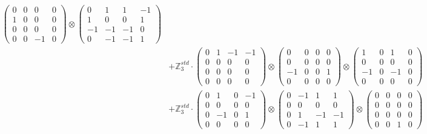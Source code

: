 \documentclass{article}
\begin{document}
{\begin{align}
            \begin{pmatrix} 0 & 0 & 0 & 0 \\ 1 & 0 & 0 & 0 \\ 0 & 0 & 0 & 0 \\ 0 & 0 & -1 & 0 \end{pmatrix} \otimes 
            \begin{pmatrix} 0 & 1 & 1 & -1 \\ 1 & 0 & 0 & 1 \\ -1 & -1 & -1 & 0 \\ 0 & -1 & -1 & 1 \end{pmatrix} \\ 
        &+ \label{Rs16-Rc11-Solution-1-c20} \mathbb{Z}_3^{std} \cdot 
            \begin{pmatrix} 0 & 1 & -1 & -1 \\ 0 & 0 & 0 & 0 \\ 0 & 0 & 0 & 0 \\ 0 & 0 & 0 & 0 \end{pmatrix} \otimes 
            \begin{pmatrix} 0 & 0 & 0 & 0 \\ 0 & 0 & 0 & 0 \\ -1 & 0 & 0 & 1 \\ 0 & 0 & 0 & 0 \end{pmatrix} \otimes 
            \begin{pmatrix} 1 & 0 & 1 & 0 \\ 0 & 0 & 0 & 0 \\ -1 & 0 & -1 & 0 \\ 0 & 0 & 0 & 0 \end{pmatrix} \\ 
        &+ \label{Rs16-Rc11-Solution-1-c21} \mathbb{Z}_3^{std} \cdot 
            \begin{pmatrix} 0 & 1 & 0 & -1 \\ 0 & 0 & 0 & 0 \\ 0 & -1 & 0 & 1 \\ 0 & 0 & 0 & 0 \end{pmatrix} \otimes 
            \begin{pmatrix} 0 & -1 & 1 & 1 \\ 0 & 0 & 0 & 0 \\ 0 & 1 & -1 & -1 \\ 0 & -1 & 1 & 1 \end{pmatrix} \otimes 
            \begin{pmatrix} 0 & 0 & 0 & 0 \\ 0 & 0 & 0 & 0 \\ 0 & 0 & 0 & 0 \\ 0 & 0 & 1 & 0 \end{pmatrix} \\ 

\end{align}}
\end{document}
